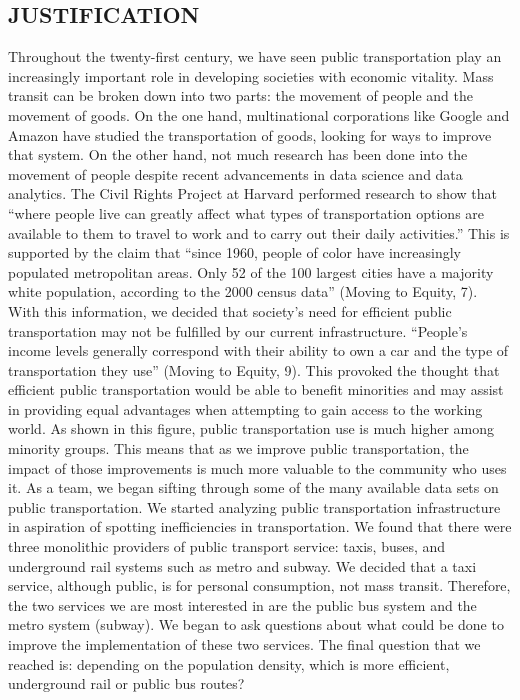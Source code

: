 \documentclass[12pt]{article}
\begin{document}
\begin{multicols}{2}
\section{JUSTIFICATION}
Throughout the twenty-first century, we have seen public transportation play an increasingly important role in developing societies with economic vitality. Mass transit can be broken down into two parts: the movement of people and the movement of goods. On the one hand, multinational corporations like Google and Amazon have studied the transportation of goods, looking for ways to improve that system. On the other hand, not much research has been done into the movement of people despite recent advancements in data science and data analytics. The Civil Rights Project at Harvard performed research to show that “where people live can greatly affect what types of transportation options are available to them to travel to work and to carry out their daily activities.” This is supported by the claim that “since 1960, people of color have increasingly populated metropolitan areas. Only 52 of the 100 largest cities have a majority white population, according to the 2000 census data” (Moving to Equity, 7). 
	With this information, we decided that society’s need for efficient public transportation may not be fulfilled by our current infrastructure. “People’s income levels generally correspond with their ability to own a car and the type of transportation they use” (Moving to Equity, 9). This provoked the thought that efficient public transportation would be able to benefit minorities and may assist in providing equal advantages when attempting to gain access to the working world. As shown in this figure, public transportation use is much higher among minority groups. This means that as we improve public transportation, the impact of those improvements is much more valuable to the community who uses it. 
As a team, we began sifting through some of the many available data sets on public transportation. We started analyzing public transportation infrastructure in aspiration of spotting inefficiencies in transportation. We found that there were three monolithic providers of public transport service: taxis, buses, and underground rail systems such as metro and subway. We decided that a taxi service, although public, is for personal consumption, not mass transit. Therefore, the two services we are most interested in are the public bus system and the metro system (subway). We began to ask questions about what could be done to improve the implementation of these two services. The final question that we reached is: depending on the population density, which is more efficient, underground rail or public bus routes?

\end{multicols}
\end{document}
